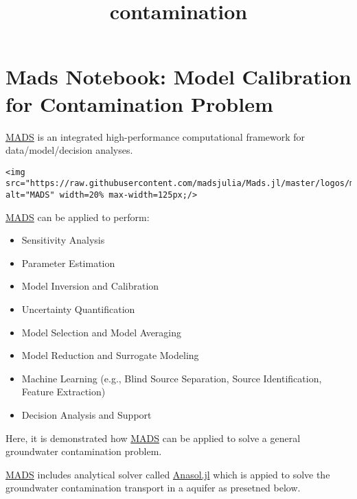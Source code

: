\documentclass[11pt]{article}
\title{contamination}
\providecommand{\tightlist}{%
      \setlength{\itemsep}{0pt}\setlength{\parskip}{0pt}}
\begin{document}
    
    \maketitle
    
    

    
    \hypertarget{mads-notebook-model-calibration-for-contamination-problem}{%
\section{Mads Notebook: Model Calibration for Contamination
Problem}\label{mads-notebook-model-calibration-for-contamination-problem}}

\href{http://madsjulia.github.io/Mads.jl}{MADS} is an integrated
high-performance computational framework for data/model/decision
analyses.

\begin{verbatim}
<img src="https://raw.githubusercontent.com/madsjulia/Mads.jl/master/logos/mads_black_swan_logo_big_text_new_3inch.png" alt="MADS" width=20% max-width=125px;/>
\end{verbatim}

\href{http://madsjulia.github.io/Mads.jl}{MADS} can be applied to
perform:

\begin{itemize}
\tightlist
\item
  Sensitivity Analysis
\item
  Parameter Estimation
\item
  Model Inversion and Calibration
\item
  Uncertainty Quantification
\item
  Model Selection and Model Averaging
\item
  Model Reduction and Surrogate Modeling
\item
  Machine Learning (e.g., Blind Source Separation, Source
  Identification, Feature Extraction)
\item
  Decision Analysis and Support
\end{itemize}

Here, it is demonstrated how
\href{http://madsjulia.github.io/Mads.jl}{MADS} can be applied to solve
a general groundwater contamination problem.

\href{http://madsjulia.github.io/Mads.jl}{MADS} includes analytical
solver called \href{http://madsjulia.github.io/Anasol.jl}{Anasol.jl}
which is appied to solve the groundwater contamination transport in a
aquifer as presetned below.
\end{document}
